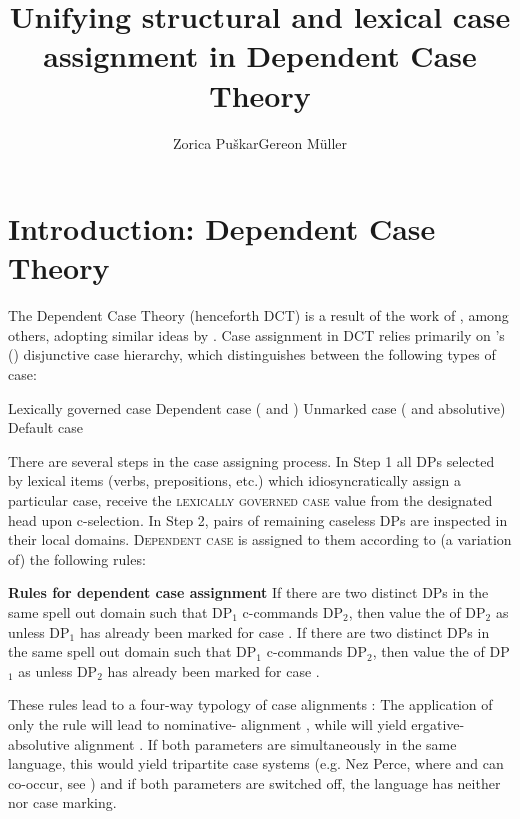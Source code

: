 \documentclass[output=paper,modfonts,newtxmath,hidelinks]{langscibook}
\title{Unifying structural and lexical case assignment in Dependent Case Theory}
\author{Zorica Puškar\affiliation{Leibniz-Zentrum Allgemeine Sprachwissenschaft, Berlin}\lastand  Gereon Müller\affiliation{University of Leipzig}}
\begin{document}
\maketitle
{}

\section{Introduction: Dependent Case Theory} 


The Dependent Case Theory (henceforth DCT) is a result of the work of \citep{marantz91,mcfadden04,bakervinokurova,baker12,baker15}, among others, adopting similar ideas by \citet{yipetal87,bittnerhale96,kiparsky92,kiparsky2001,wunderlich97,stiebels2002}. Case assignment in DCT relies primarily on \citeauthor{marantz91}'s (\citeyear[24]{marantz91}) disjunctive case hierarchy, which distinguishes between the following types of case:

\ea Lexically governed case \before{} Dependent case ( and ) \before{} Unmarked case ( and absolutive) \before{} Default case 
\z

\noindent There are several steps in the case assigning process. In Step 1 all DPs selected by lexical items (verbs, prepositions, etc.) which idiosyncratically assign a particular case, receive the \textsc{lexically governed case} value from the designated head upon c-selection. In Step 2, pairs of remaining caseless DPs are inspected in their local domains. \textsc{Dependent case} is assigned to them according to (a variation of) the following  rules: 

\ea\label{16:ex2} \textbf{Rules for dependent case assignment} \citep[48-49]{baker15}
\ea\label{16:ex2a} If there are two distinct DPs in the same spell out domain such that DP$_1$ c-commands DP$_2$, then value the  of DP$_2$ as  unless DP$_1$ has already been marked for case . 
\ex\label{16:ex2b} If there are two distinct DPs in the same spell out domain such that DP$_1$ c-commands DP$_2$, then value the  of DP$_1$ as  unless DP$_2$ has already been marked for case . 
\z \z

\noindent These rules lead to a four-way typology of case alignments \citep{levinpreminger}: The application of only the rule  will lead to nominative- alignment , while  will yield ergative-absolutive alignment . If both parameters are simultaneously  in the same language, this would yield tripartite case systems (e.g. Nez Perce, where  and  can co-occur, see \citealt{baker15}) and if both parameters are switched off, the language has neither  nor  case marking.
\end{document}
